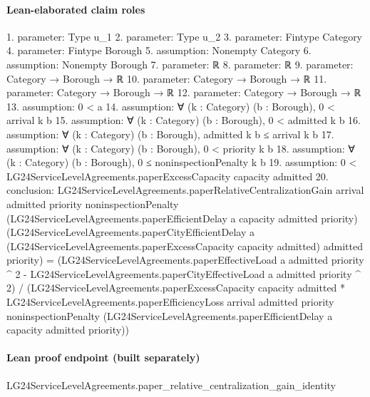 \documentclass[10pt]{article}
\begin{document}
\paragraph{Lean-elaborated claim roles}\begin{ReviewVerbatim}
1. parameter: Type u_1
2. parameter: Type u_2
3. parameter: Fintype Category
4. parameter: Fintype Borough
5. assumption: Nonempty Category
6. assumption: Nonempty Borough
7. parameter: ℝ
8. parameter: ℝ
9. parameter: Category → Borough → ℝ
10. parameter: Category → Borough → ℝ
11. parameter: Category → Borough → ℝ
12. parameter: Category → Borough → ℝ
13. assumption: 0 < a
14. assumption: ∀ (k : Category) (b : Borough), 0 < arrival k b
15. assumption: ∀ (k : Category) (b : Borough), 0 < admitted k b
16. assumption: ∀ (k : Category) (b : Borough), admitted k b ≤ arrival k b
17. assumption: ∀ (k : Category) (b : Borough), 0 < priority k b
18. assumption: ∀ (k : Category) (b : Borough), 0 ≤ noninspectionPenalty k b
19. assumption: 0 < LG24ServiceLevelAgreements.paperExcessCapacity capacity admitted
20. conclusion: LG24ServiceLevelAgreements.paperRelativeCentralizationGain arrival admitted priority noninspectionPenalty
    (LG24ServiceLevelAgreements.paperEfficientDelay a capacity admitted priority)
    (LG24ServiceLevelAgreements.paperCityEfficientDelay a
      (LG24ServiceLevelAgreements.paperExcessCapacity capacity admitted) admitted priority) =
  (LG24ServiceLevelAgreements.paperEffectiveLoad a admitted priority ^ 2 -
      LG24ServiceLevelAgreements.paperCityEffectiveLoad a admitted priority ^ 2) /
    (LG24ServiceLevelAgreements.paperExcessCapacity capacity admitted *
      LG24ServiceLevelAgreements.paperEfficiencyLoss arrival admitted priority noninspectionPenalty
        (LG24ServiceLevelAgreements.paperEfficientDelay a capacity admitted priority))
\end{ReviewVerbatim}

\paragraph{Lean proof endpoint (built separately)}\begin{ReviewVerbatim}
LG24ServiceLevelAgreements.paper_relative_centralization_gain_identity
\end{ReviewVerbatim}
\end{document}
